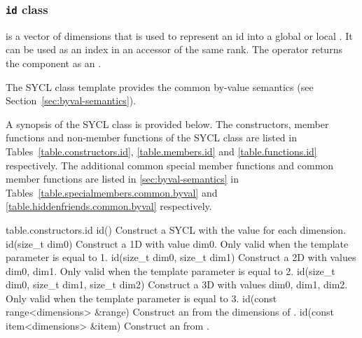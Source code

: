 \subsubsection{\texttt{id} class}
\label{id-class}

 is a vector of dimensions that is used to
represent an \gls{id} into a global or local
. It can be used as an index in an accessor of the
same rank. The \tf{[n]} operator returns the component  as an
.

The SYCL  class template provides the common by-value semantics
(see Section~\ref{sec:byval-semantics}).

A synopsis of the SYCL  class is provided below. The constructors, member functions and non-member functions of the SYCL  class are listed in Tables~\ref{table.constructors.id}, \ref{table.members.id} and \ref{table.functions.id} respectively. The additional common special member functions and common member functions are listed in \ref{sec:byval-semantics} in Tables~\ref{table.specialmembers.common.byval} and \ref{table.hiddenfriends.common.byval} respectively.


{table.constructors.id}
  \addRow
    {id()}
    {
        Construct a SYCL  with the value  for each dimension.
    }
  \addRow
    {id(size_t dim0)}
    {
        Construct a 1D  with value dim0.
        Only valid when the template parameter  is equal
        to 1.
    }
  \addRow
    {id(size_t dim0, size_t dim1)}
    {
        Construct a 2D  with values dim0, dim1.
        Only valid when the template parameter  is equal
  to 2.
    }
  \addRow
    {id(size_t dim0, size_t dim1, size_t dim2)}
    {
        Construct a 3D  with values dim0, dim1, dim2. 
        Only valid when the template parameter  is equal
  to 3.
    }
  \addRow
    {id(const range<dimensions> \&range)}
    {
        Construct an  from the dimensions of .
    }
  \addRow
    {id(const item<dimensions> \&item)}
    {
        Construct an  from .
    }
\completeTable


